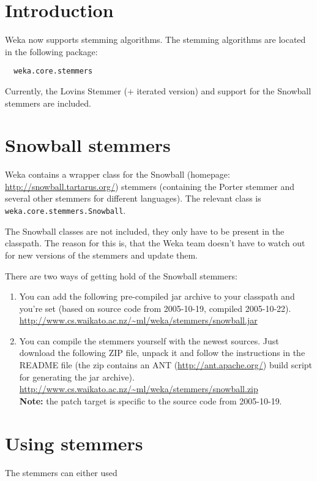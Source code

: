 
\section{Introduction}
Weka now supports stemming algorithms. The stemming algorithms are located in the following package:

\begin{verbatim}
  weka.core.stemmers
\end{verbatim}

\noindent Currently, the Lovins Stemmer (+ iterated version) and support for the Snowball stemmers are included.

\section{Snowball stemmers}
Weka contains a wrapper class for the Snowball (homepage: \url{http://snowball.tartarus.org/}{}) stemmers (containing the Porter stemmer and several other stemmers for different languages). The relevant class is \texttt{weka.core.stemmers.Snowball}.

The Snowball classes are not included, they only have to be present in the classpath. The reason for this is, that the Weka team doesn't have to watch out for new versions of the stemmers and update them.

There are two ways of getting hold of the Snowball stemmers:

\begin{enumerate}
	\item You can add the following pre-compiled jar archive to your classpath and you're set (based on source code from 2005-10-19, compiled 2005-10-22). \\
	\url{http://www.cs.waikato.ac.nz/~ml/weka/stemmers/snowball.jar}{}
	\item You can compile the stemmers yourself with the newest sources. Just download the following ZIP file, unpack it and follow the instructions in the README file (the zip contains an ANT (\url{http://ant.apache.org/}{}) build script for generating the jar archive). \\
	\url{http://www.cs.waikato.ac.nz/~ml/weka/stemmers/snowball.zip}{} \\
      \textbf{Note:} the patch target is specific to the source code from 2005-10-19.
\end{enumerate}

\newpage
\section{Using stemmers}
The stemmers can either used

